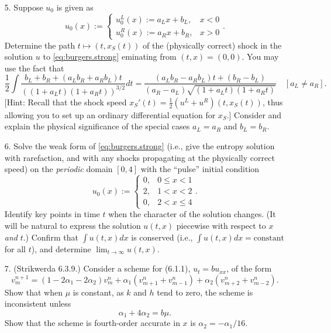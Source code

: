 \documentclass{article}
\begin{document}
\begin{itemize}
\item[5.] Suppose $u_0$ is given as
\begin{equation*}
u_0(x) := \begin{cases} u^L_0(x) := a_L x + b_L, & x < 0 \\ u^R_0(x) := a_R x + b_R, & x > 0 \end{cases}.
\end{equation*}
Determine the path $t \mapsto \left( t, x_S(t) \right)$ of the (physically correct) shock in the solution $u$ to \eqref{eq:burgers.strong} eminating from $(t,x) = (0,0)$. You may use the fact that
\begin{equation*}
\frac{1}{2} \int \frac{b_L + b_R + \left( a_L b_R + a_R b_L \right) t}{\left( \left( 1 + a_L t \right) \left( 1 + a_R t \right) \right)^{3/2}} dt = \frac{\left( a_L b_R - a_R b_L \right) t + \left( b_R - b_L \right)}{\left( a_R - a_L \right) \sqrt{\left( 1 + a_L t \right) \left( 1 + a_R t \right)}} \quad \left[ a_L \neq a_R \right].
\end{equation*}
[Hint: Recall that the shock speed $x_S'(t) = \frac{1}{2} \left( u^L + u^R \right) \left( t, x_S(t) \right)$, thus allowing you to set up an ordinary differential equation for $x_S$.] Consider and explain the physical significance of the special cases $a_L = a_R$ and $b_L = b_R$.

\item[6.] Solve the weak form of \eqref{eq:burgers.strong} (i.e., give the entropy solution with rarefaction, and with any shocks propagating at the physically correct speed) on the \emph{periodic} domain $[0,4]$ with the ``pulse'' initial condition
\begin{equation*}
u_0(x) := \begin{cases} 0, & 0 \leq x < 1 \\ 2, & 1 < x < 2 \\ 0, & 2 < x \leq 4 \end{cases}.
\end{equation*}
Identify key points in time $t$ when the character of the solution changes. (It will be natural to express the solution $u(t,x)$ piecewise with respect to $x$ \emph{and} $t$.) Confirm that $\int u(t,x) dx$ is conserved (i.e., $\int u(t,x) dx = \text{constant}$ for all $t$), and determine $\lim_{t \to \infty} u(t,x)$.

\item[7.] (Strikwerda 6.3.9.) Consider a scheme for (6.1.1), $u_t = b u_{xx}$, of the form
\begin{equation*}
v^{n+1}_m = \left( 1 - 2 \alpha_1 - 2 \alpha_2 \right) v^n_m + \alpha_1 \left( v^n_{m+1} + v^n_{m-1} \right) + \alpha_2 \left( v^n_{m+2} + v^n_{m-2} \right).
\end{equation*}
Show that when $\mu$ is constant, as $k$ and $h$ tend to zero, the scheme is inconsistent unless
\begin{equation*}
\alpha_1 + 4 \alpha_2 = b \mu.
\end{equation*}
Show that the scheme is fourth-order accurate in $x$ is $\alpha_2 = -\alpha_1 / 16$.

\end{itemize}
\end{document}
